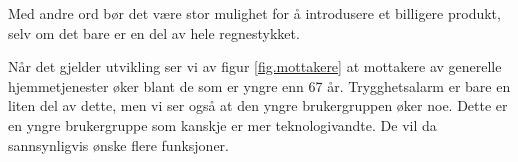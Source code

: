 Med andre ord bør det være stor mulighet for å introdusere et billigere
produkt, selv om det bare er en del av hele regnestykket.

Når det gjelder utvikling ser vi av figur \vref{fig.mottakere} at mottakere av
generelle hjemmetjenester øker blant de som er yngre enn 67 år. Trygghetsalarm
er bare en liten del av dette, men vi ser også at den yngre brukergruppen øker
noe. Dette er en yngre brukergruppe som kanskje er mer teknologivandte. De vil
da sannsynligvis ønske flere funksjoner.




